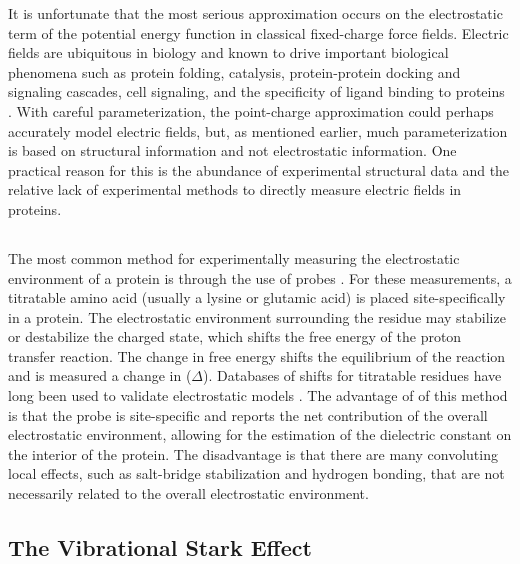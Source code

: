 It is unfortunate that the most serious approximation occurs on the electrostatic term of the potential energy function in classical fixed-charge force fields. 
Electric fields are ubiquitous in biology and known to drive important biological phenomena such as protein folding, catalysis, protein-protein docking and signaling cascades, cell signaling, and the specificity of ligand binding to proteins \cite{Hayes1976, Warshel1978, Honig1995, Gunner1996, Warshel1998}. 
With careful parameterization, the point-charge approximation could perhaps accurately model electric fields, but, as mentioned earlier, much parameterization is based on structural information and not electrostatic information. 
One practical reason for this is the abundance of experimental structural data and the relative lack of experimental methods to directly measure electric fields in proteins. 

\subsection{\pKa{}}

The most common method for experimentally measuring the electrostatic environment of a protein is through the use of \pKa{} probes \cite{Bradbury1966, Forsyth2002, Isom2010, Langsetmo1991, Markley1975}. 
For these measurements, a titratable amino acid (usually a lysine or glutamic acid) is placed site-specifically in a protein. 
The electrostatic environment surrounding the residue may stabilize or destabilize the charged state, which shifts the free energy of the proton transfer reaction. 
The change in free energy shifts the equilibrium of the reaction and is measured a change in \pKa{} ($\Delta$\pKa{}).
Databases of \pKa{} shifts for titratable residues have long been used to validate electrostatic models \cite{Gibas1996, Antosiewicz1996, Fogolari2002, Li2005, Witham2011, Meyer2015, Mehler1999, Nielsen2011}. 
The advantage of of this method is that the probe is site-specific and reports the net contribution of the overall electrostatic environment, allowing for the estimation of the dielectric constant on the interior of the protein. 
The disadvantage is that there are many convoluting local effects, such as salt-bridge stabilization and hydrogen bonding, that are not necessarily related to the overall electrostatic environment. 

\subsection{The Vibrational Stark Effect}


